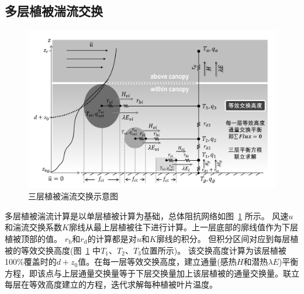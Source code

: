 \subsection{多层植被湍流交换}\label{多层植被湍流交换}
{
  \begin{figure}[htbp]
    \centering
    \includegraphics[width=1\linewidth]{Figures/地表湍流交换过程/三层植被湍流交换示意图_v3.jpg}
    \caption{三层植被湍流交换示意图}
    \label{fig:三层植被湍流交换示意图}
  \end{figure}
}

多层植被湍流计算是以单层植被计算为基础，总体阻抗网络如图~\ref{fig:三层植被湍流交换示意图} 所示。
风速$u$和湍流交换系数$K$廓线从最上层植被往下进行计算。上一层底部的廓线值作为下层植被顶部的值。
$r_{\mathrm {b}}$和$r_{\mathrm {d}}$的计算都是对$u$和$K$廓线的积分。
但积分区间对应到每层植被的等效交换高度(图~\ref{fig:三层植被湍流交换示意图} 中$T_{1}$、$T_{2}$、$T_{3}$位置所示)。
该交换高度计算为该层植被100\%覆盖时的$d+z_0$值。在每一层等效交换高度，建立通量(感热$H$和潜热$\lambda E$)平衡方程，即该点与上层通量交换量等于下层交换量加上该层植被的通量交换量。联立每层在等效高度建立的方程，迭代求解每种植被叶片温度。

